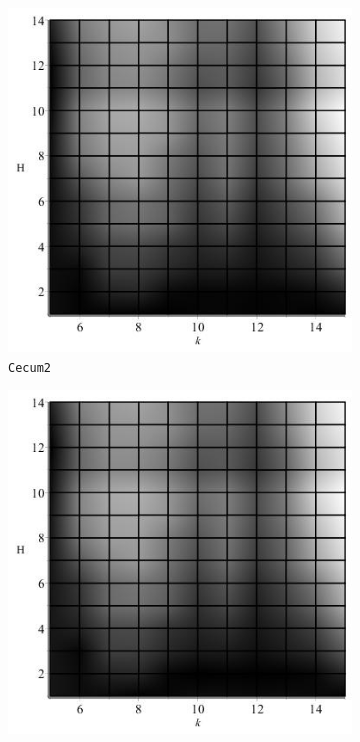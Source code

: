 \documentclass[../../main.tex]{subfiles}
\begin{document}
\begin{figure}[H]
\begin{subfigure}[b]{.5\textwidth}
\includegraphics[width=\textwidth]{precision/minmaxhalf/cecum2precise}
\caption{\texttt{Cecum2}}
\end{subfigure}
\begin{subfigure}[b]{.5\textwidth}
\includegraphics[width=\textwidth]{precision/minmaxhalf/cecum3precise}

\end{subfigure}
\end{figure}
\end{document}
